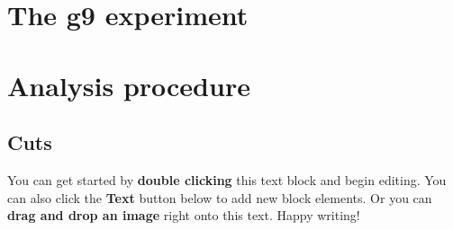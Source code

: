 
\tableofcontents

\section{The g9 experiment}
\section{Analysis procedure}
\subsection{Cuts}


You can get started by \textbf{double clicking} this text block and begin editing. You can also click the \textbf{Text} button below to add new block elements. Or you can \textbf{drag and drop an image} right onto this text. Happy writing!
